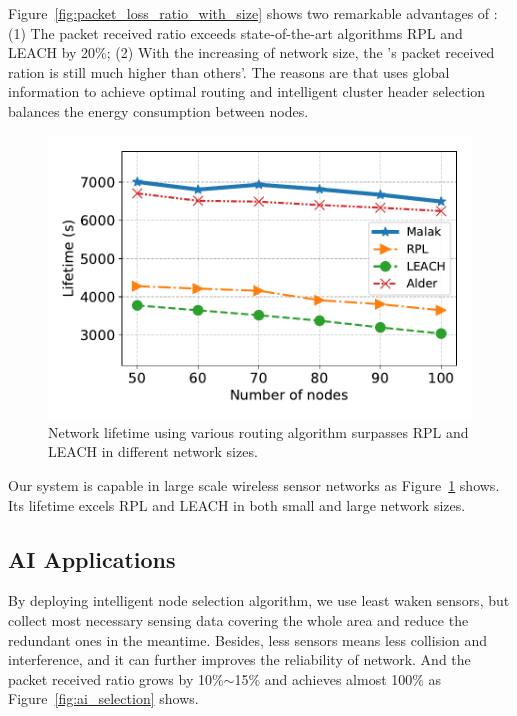 Figure~\ref{fig:packet_loss_ratio_with_size} shows two remarkable advantages of
{\sdn}: (1) The packet received ratio exceeds state-of-the-art algorithms
RPL\cite{winter2012rpl} and LEACH\cite{kaur2016wsn} by 20\%; (2) With the
increasing of network size, the {\sdn}'s packet received ration is still much
higher than others'. The reasons are that {\sdn} uses global information to
achieve optimal routing and intelligent cluster header selection balances the
energy consumption between nodes.

\begin{figure}[!h]
	\centering
	\includegraphics[width=.95\columnwidth]{Figure/lifetime}
	\vspace{-0.1in}
	\caption{Network lifetime using various routing algorithm
		\textnormal{
			{\sdn} surpasses RPL and LEACH in different network sizes.
		}}
	\label{fig:lifetime}
\end{figure}

Our {\sdn} system is capable in large scale wireless sensor networks as
Figure~\ref{fig:lifetime} shows. Its lifetime excels RPL and LEACH in both
small and large network sizes.

\subsection{AI Applications}

By deploying intelligent node selection algorithm, we use least waken sensors,
but collect most necessary sensing data covering the whole area and reduce the
redundant ones in the meantime. Besides, less sensors means less collision and
interference, and it can further improves the reliability of network. And the
packet received ratio grows by 10\%$\sim$15\% and achieves almost 100\% as
Figure~\ref{fig:ai_selection} shows.

